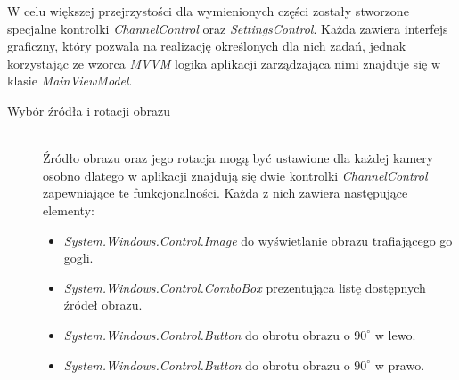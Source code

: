 \documentclass[a4paper,11pt,twoside]{report}
\theoremstyle{definition}
\begin{document}
W celu większej przejrzystości dla wymienionych części zostały stworzone specjalne kontrolki \textit{ChannelControl} oraz \textit{SettingsControl}. Każda zawiera interfejs graficzny, który pozwala na realizację określonych dla nich zadań, jednak korzystając ze wzorca \textit{MVVM} logika aplikacji zarządzająca nimi znajduje się w klasie \textit{MainViewModel}. 

\begin{description}
\item [Wybór źródła i rotacji obrazu] \hfill \\

Źródło obrazu oraz jego rotacja mogą być ustawione dla każdej kamery osobno dlatego w aplikacji znajdują się dwie kontrolki \textit{ChannelControl} zapewniające te funkcjonalności. Każda z nich zawiera  następujące elementy:

\begin{itemize}
\item \textit{System.Windows.Control.Image} do wyświetlanie obrazu trafiającego go gogli.
\item \textit{System.Windows.Control.ComboBox} prezentująca listę dostępnych źródeł obrazu.
\item \textit{System.Windows.Control.Button} do obrotu obrazu o $90^\circ$ w lewo.
\item \textit{System.Windows.Control.Button} do obrotu obrazu o $90^\circ$ w prawo.
\end{itemize}


\end{description}
\end{document}
